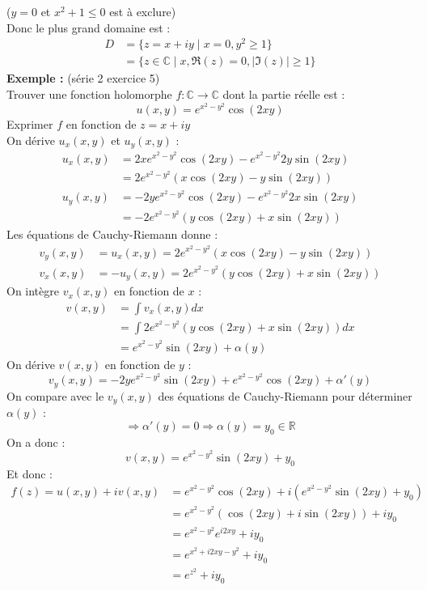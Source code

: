 ($y=0$ et $x^2+1 \leq 0$ est à exclure) \\
Donc le plus grand domaine est :
\begin{align*}
    D &= \{z = x+iy \mid x = 0, y^2 \geq 1\} \\
    &= \{z \in \mathbb{C} \mid x, \Re(z) = 0, |\Im(z)| \geq 1\}
\end{align*}
\textbf{Exemple :} (série 2 exercice 5) \\
Trouver une fonction holomorphe $f : \mathbb{C} \to \mathbb{C}$ dont la partie réelle est :
$$u(x,y) = e^{x^2-y^2}\cos(2xy)$$
Exprimer $f$ en fonction de $z=x+iy$ \\
On dérive $u_x(x,y)$ et $u_y(x,y)$ :
\begin{align*}
    u_x(x,y) &= 2xe^{x^2-y^2}\cos(2xy)-e^{x^2-y^2}2y\sin(2xy) \\
    &= 2e^{x^2-y^2}(x\cos(2xy) - y\sin(2xy)) \\
    u_y(x,y)& = -2ye^{x^2-y^2}\cos(2xy)-e^{x^2-y^2}2x\sin(2xy) \\
    &= -2e^{x^2-y^2}(y\cos(2xy)+x\sin(2xy))
\end{align*}
Les équations de Cauchy-Riemann donne :
\begin{align*}
    v_y(x,y) &= u_x(x,y) = 2e^{x^2-y^2}(x\cos(2xy) - y\sin(2xy)) \\
    v_x(x,y) &= -u_y(x,y) = 2e^{x^2-y^2}(y\cos(2xy)+x\sin(2xy))
\end{align*}
On intègre $v_x(x,y)$ en fonction de $x$ :
\begin{align*}
    v(x,y) &= \int v_x(x,y) dx \\
    &= \int 2e^{x^2-y^2}(y\cos(2xy)+x\sin(2xy)) dx \\
    &= e^{x^2-y^2}\sin(2xy) + \alpha(y)
\end{align*}
On dérive $v(x,y)$ en fonction de $y$ :
$$v_y(x,y) = -2ye^{x^2-y^2}\sin(2xy)+e^{x^2-y^2}\cos(2xy) + \alpha'(y)$$
On compare avec le $v_y(x,y)$ des équations de Cauchy-Riemann pour déterminer $\alpha(y)$ :
$$\Rightarrow \alpha'(y) = 0 \Rightarrow \alpha(y) = y_0 \in \mathbb{R}$$
On a donc :
$$v(x,y) = e^{x^2-y^2}\sin(2xy) + y_0$$
Et donc :
\begin{align*}
    f(z) = u(x,y) +iv(x,y) &= e^{x^2-y^2}\cos(2xy) + i(e^{x^2-y^2}\sin(2xy)+y_0) \\
    &= e^{x^2-y^2}(\cos(2xy) +i\sin(2xy)) +iy_0 \\
    &= e^{x^2-y^2}e^{i2xy} +iy_0 \\
    &= e^{x^2+i2xy-y^2} +iy_0 \\
    &= e^{z^2} + iy_0
\end{align*}